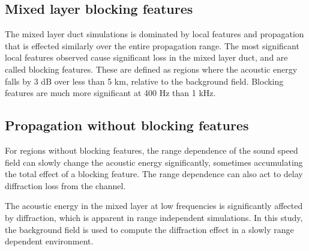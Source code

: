 \documentclass[preprint,NumberedRefs]{JASA}
\begin{document}
\subsection{Mixed layer blocking features}
The mixed layer duct simulations is dominated by local features and propagation that is effected similarly over the entire propagation range. The most significant local features observed cause significant loss in the mixed layer duct, and are called blocking features. These are defined as regions where the acoustic energy falls by 3 dB over less than 5 km, relative to the background field. Blocking features are much more significant at 400 Hz than 1 kHz.

\subsection{Propagation without blocking features}

For regions without blocking features, the range dependence of the sound speed field can slowly change the acoustic energy significantly, sometimes accumulating the total effect of a blocking feature. The range dependence can also act to delay diffraction loss from the channel.

The acoustic energy in the mixed layer at low frequencies is significantly affected by diffraction, which is apparent in range independent simulations. In this study, the background field is used to compute the diffraction effect in a slowly range dependent environment.



\end{document}
